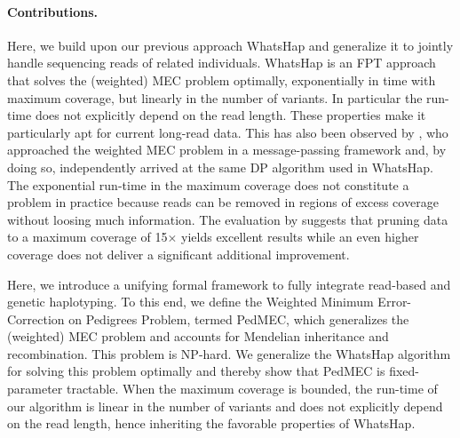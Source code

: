 \paragraph{Contributions.}
Here, we build upon our previous approach WhatsHap \citep{Patterson2014,Patterson2015} and generalize it to jointly handle sequencing reads of related individuals.
WhatsHap is an FPT approach that solves the (weighted) MEC problem optimally, exponentially in time with maximum coverage, but linearly in the number of variants.
In particular the run-time does not explicitly depend on the read length.
These properties make it particularly apt for current long-read data. 
This has also been observed by \citet{Kuleshov2014b}, who approached the weighted MEC problem in a message-passing framework and, by doing so, independently arrived at the same DP algorithm used in WhatsHap.
The exponential run-time in the maximum coverage does not constitute a problem in practice because reads can be removed in regions of excess coverage without loosing much information.
The evaluation by \cite{Patterson2015} suggests that pruning data to a maximum coverage of 15$\times$ yields excellent results while an even higher coverage does not deliver a significant additional improvement.

Here, we introduce a unifying formal framework to fully integrate read-based and genetic haplotyping.
To this end, we define the Weighted Minimum Error-Correction on Pedigrees Problem, termed PedMEC, which generalizes the (weighted) MEC problem and accounts for Mendelian inheritance and recombination.
This problem is NP-hard.
We generalize the WhatsHap algorithm for solving this problem optimally and thereby show that PedMEC is fixed-parameter tractable.
When the maximum coverage is bounded, the run-time of our algorithm is linear in the number of variants and does not explicitly depend on the read length, hence inheriting the favorable properties of WhatsHap.


